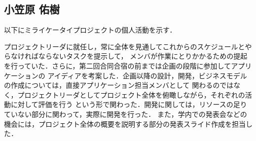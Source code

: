 \subsection{小笠原 佑樹}

以下にミライケータイプロジェクトの個人活動を示す．

プロジェクトリーダに就任し，常に全体を見通してこれからのスケジュールとやらなければならないタスクを提示して，
メンバが作業にとりかかるための提起を行っていた．さらに，第二回合同合宿の前までは企画の段階に参加してアプリケーションの
アイディアを考案した．企画以降の設計，開発，ビジネスモデルの作成については，直接アプリケーション担当メンバとして
関わるのではなく，プロジェクトリーダとしてプロジェクト全体を俯瞰しながら，それぞれの活動に対して評価を行う
という形で関わった．開発に関しては，リソースの足りていない部分に関わって，実際に開発を行った．
また，学内での発表会などの機会には，プロジェクト全体の概要を説明する部分の発表スライド作成を担当した．


